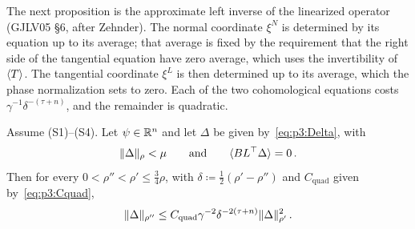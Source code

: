 The next proposition is the approximate left inverse of the linearized operator (GJLV05 \S6, after
Zehnder). The normal coordinate $\xi^N$ is determined by its equation up to its average; that average
is fixed by the requirement that the right side of the tangential equation have zero average, which
uses the invertibility of $\langle T\rangle$. The tangential coordinate $\xi^L$ is then determined up to its
average, which the phase normalization sets to zero. Each of the two cohomological equations costs
$\gamma^{-1}\delta^{-(\tau+n)}$, and the remainder is quadratic.

\begin{proposition}\label{bp:p3:quadratic}
Assume (S1)--(S4). Let $\psi\in\mathbb{R}^n$ and let $\Delta$ be given by~\eqref{eq:p3:Delta}, with
\begin{equation*}
\lVert \Delta\rVert_\rho<\mu\qquad\text{and}\qquad\langle BL^\top\Delta\rangle=0\,.
\end{equation*}
Then for every $0<\rho''<\rho'\le\frac34\rho$, with $\delta\coloneqq\frac12(\rho'-\rho'')$ and
$C_{\mathrm{quad}}$ given by~\eqref{eq:p3:Cquad},
\begin{equation*}
\lVert \Delta\rVert_{\rho''}\le C_{\mathrm{quad}}\gamma^{-2}\delta^{-2(\tau+n)}\lVert \Delta\rVert_{\rho'}^2\,.
\end{equation*}
\end{proposition}


